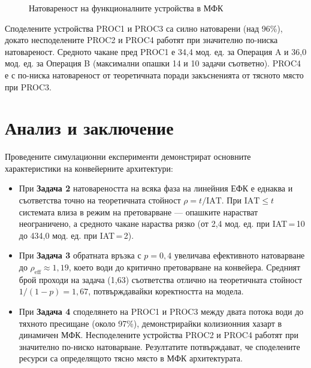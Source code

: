 \begin{figure}[H]
    \centering
    \caption{Натовареност на функционалните устройства в МФК}
    \label{fig:task4_util}
\end{figure}

Споделените устройства PROC1 и PROC3 са силно натоварени (над 96\%), докато несподелените PROC2 и PROC4 работят при значително по-ниска натовареност. Средното чакане пред PROC1 е 34{,}4 мод. ед. за Операция A и 36{,}0 мод. ед. за Операция B (максимални опашки 14 и 10 задачи съответно). PROC4 е с по-ниска натовареност от теоретичната поради закъсненията от тясното място при PROC3.

\section{Анализ и заключение}

Проведените симулационни експерименти демонстрират основните характеристики на конвейерните архитектури:
\begin{itemize}
    \item При \textbf{Задача 2} натовареността на всяка фаза на линейния ЕФК е еднаква и съответства точно на теоретичната стойност $\rho = t / \mathrm{IAT}$. При $\mathrm{IAT} \leq t$ системата влиза в режим на претоварване --- опашките нарастват неограничено, а средното чакане нараства рязко (от 2{,}4 мод. ед. при IAT\,=\,10 до 434{,}0 мод. ед. при IAT\,=\,2).

    \item При \textbf{Задача 3} обратната връзка с $p = 0{,}4$ увеличава ефективното натоварване до $\rho_\mathrm{eff} \approx 1{,}19$, което води до критично претоварване на конвейера. Средният брой проходи на задача (1{,}63) съответства отлично на теоретичната стойност $1/(1-p) = 1{,}67$, потвърждавайки коректността на модела.

    \item При \textbf{Задача 4} споделянето на PROC1 и PROC3 между двата потока води до тяхното пресищане (около 97\%), демонстрирайки колизионния хазарт в динамичен МФК. Несподелените устройства PROC2 и PROC4 работят при значително по-ниско натоварване. Резултатите потвърждават, че споделените ресурси са определящото тясно място в МФК архитектурата.
\end{itemize}
